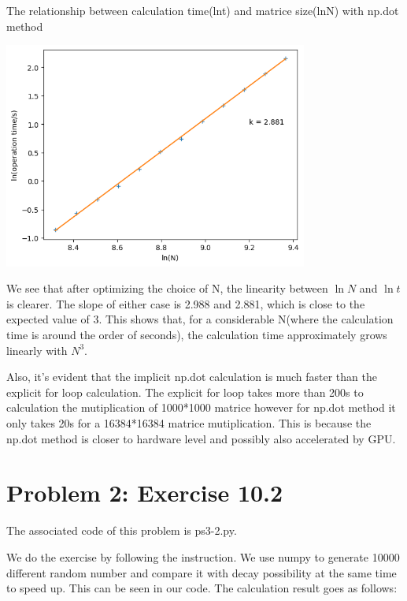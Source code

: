 \documentclass[letterpaper,12pt]{article}
\begin{document}
\begin{table}[!h]
    \centering
    \caption{The relationship between calculation time(lnt) and matrice size(lnN) with np.dot method}
    \includegraphics[width=10cm]{ps3-14.png}
    \label{plot}%
\end{table}%

\newpage

We see that after optimizing the choice of N, the linearity between $\ln{N}$ and $\ln{t}$ is clearer. The slope of either case is 2.988 and 2.881, which is close to the expected value of 3. This shows that, for a considerable N(where the calculation time is around the order of seconds), the calculation time approximately grows linearly with $N^3$.

Also, it's evident that the implicit np.dot calculation is much faster than the explicit for loop calculation. The explicit for loop takes more than 200s to calculation the mutiplication of 1000*1000 matrice however for np.dot method it only takes 20s for a 16384*16384 matrice mutiplication. This is because the np.dot method is closer to hardware level and possibly also accelerated by GPU.

\section{Problem 2: Exercise 10.2}

The associated code of this problem is ps3-2.py.

We do the exercise by following the instruction. We use numpy to generate 10000 different random number and compare it with decay possibility at the same time to speed up. This can be seen in our code. The calculation result goes as follows:
\end{document}
